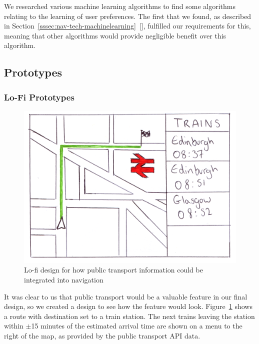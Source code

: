 \documentclass{article}
\begin{document}
We researched various machine learning algorithms to find some algorithms relating to the learning of user preferences. The first that we found, as described in Section~\ref{sssec:nav-tech-machinelearning}~[], fulfilled our requirements for this, meaning that other algorithms would provide negligible benefit over this algorithm.
%
%

\subsection{Prototypes}\label{ssec:nav-prototypes-testing}

\subsubsection{Lo-Fi Prototypes}
\begin{figure}[H]
  \centering
  \includegraphics[scale=0.5]{train-widget}
  \caption{Lo-fi design for how public transport information could be integrated into navigation}\label{train-widget}
\end{figure}
It was clear to us that public transport would be a valuable feature in our final design, so we created a design to see how the feature would look. Figure~\ref{train-widget} shows a route with destination set to a train station. The next trains leaving the station within $\pm$15 minutes of the estimated arrival time are shown on a menu to the right of the map, as provided by the public transport API data.
\end{document}
